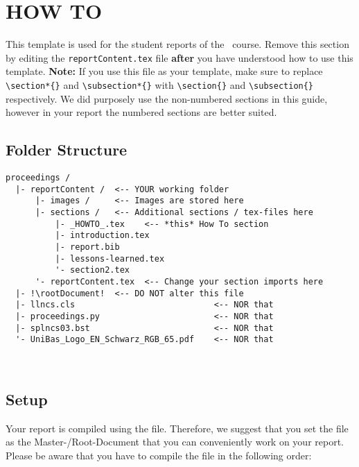 \section*{HOW TO}
\label{sec:usage}
This template is used for the student reports of the \coursename\ course. Remove this section by editing the \texttt{reportContent.tex} file \textbf{after} you have understood how to use this template.
\medskip
\textbf{Note:} If you use this file as your template, make sure to replace \verb|\section*{}| and \verb|\subsection*{}| with \verb|\section{}| and \verb|\subsection{}| respectively. We did purposely use the non-numbered sections in this guide, however in your report the numbered sections are better suited.

\subsection*{Folder Structure}
\begin{lstlisting}[escapechar=!]
proceedings /
  |- reportContent /  <-- YOUR working folder
      |- images /     <-- Images are stored here
      |- sections /   <-- Additional sections / tex-files here
          |- _HOWTO_.tex    <-- *this* How To section
          |- introduction.tex
          |- report.bib
          |- lessons-learned.tex
          '- section2.tex
      '- reportContent.tex  <-- Change your section imports here
  |- !\rootDocument!  <-- DO NOT alter this file
  |- llncs.cls                            <-- NOR that
  |- proceedings.py                       <-- NOR that
  |- splncs03.bst                         <-- NOR that
  '- UniBas_Logo_EN_Schwarz_RGB_65.pdf    <-- NOR that
\end{lstlisting}
\ 

\subsection*{Setup}
Your report is compiled using the \texttt{\rootDocument} file. Therefore, we suggest that you set the file \texttt{\rootDocument} as the Master-/Root-Document that you can conveniently work on your report.
Please be aware that you have to compile the \texttt{\rootDocument} file in the following order:

